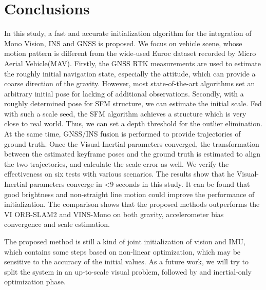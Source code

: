 \documentclass[journal,article,submit,moreauthors,pdftex]{Definitions/mdpi}
\begin{document}

\section{Conclusions}
\label{Conclusions}
In this study, a fast and accurate initialization algorithm for the 
integration of Mono Vision, INS and GNSS is proposed.
We focus on vehicle scene, whose motion pattern is different from the 
wide-used Euroc dataset\cite{burriEuRoCMicroAerial2016a} recorded by 
Micro Aerial Vehicle(MAV).
Firstly, the GNSS RTK measurements are used to estimate the roughly 
initial navigation state, especially the attitude, which can provide
a coarse direction of the gravity. 
However, most state-of-the-art algorithms set an arbitrary initial 
pose for lacking of additional observations.
Secondly, with a roughly determined pose for SFM structure, we can estimate 
the initial scale.
Fed with such a scale seed, the SFM algorithm achieves a structure which 
is very close to real world.
Thus, we can set a depth threshold for the outlier elimination.
At the same time, GNSS/INS fusion is performed to provide trajectories of 
ground truth.
Once the Visual-Inertial parameters converged, the transformation between 
the estimated keyframe poses and the ground truth is estimated to align the 
two trajectories, and calculate the scale error as well.
We verify the effectiveness on six tests with various scenarios.
The results show that he Visual-Inertial parameters converge in <9 seconds 
in this study.
It can be found that good brightness and non-straight line motion could 
improve the performance of initialization.
The comparison shows that the proposed methods outperforms the 
VI ORB-SLAM2 and VINS-Mono on both gravity, accelerometer bias convergence 
and scale estimation.

The proposed method is still a kind of joint initialization of vision 
and IMU, which contains some steps based on non-linear optimization, which 
may be sensitive to the accuracy of the initial values. 
As a future work, we will try to split the system in an up-to-scale visual 
problem, followed by and inertial-only optimization phase.
\end{document}
